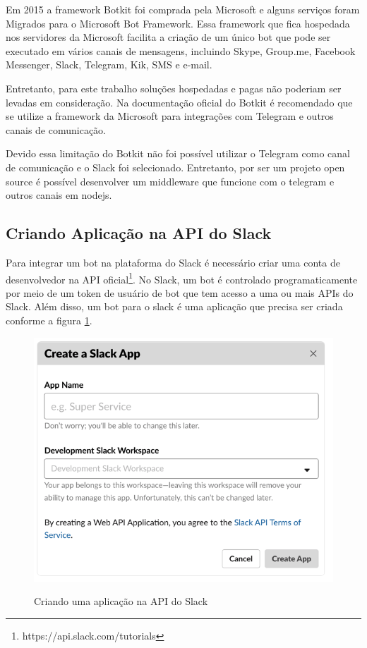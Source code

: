 Em 2015 a framework Botkit foi comprada pela Microsoft e alguns serviços foram Migrados para o Microsoft Bot Framework. Essa framework que fica hospedada nos servidores da Microsoft facilita a criação de um único bot que pode ser executado em vários canais de mensagens, incluindo Skype, Group.me, Facebook Messenger, Slack, Telegram, Kik, SMS e e-mail.

Entretanto, para este trabalho soluções hospedadas e pagas não poderiam ser levadas em consideração. Na documentação oficial do Botkit é recomendado que se utilize a framework da Microsoft para integrações com Telegram e outros canais de comunicação.

Devido essa limitação do Botkit não foi possível utilizar o Telegram como canal de comunicação e o Slack foi selecionado. Entretanto, por ser um projeto open source é possível desenvolver um middleware que funcione com o telegram e outros canais em nodejs. 

\subsection{Criando Aplicação na API do Slack}

Para integrar um bot na plataforma do Slack é necessário criar uma conta de desenvolvedor na API oficial\footnote{https://api.slack.com/tutorials}. No Slack, um bot é controlado programaticamente por meio de um token de usuário de bot que tem acesso a uma ou mais APIs do Slack. Além disso, um bot para o slack é uma aplicação que precisa ser criada conforme a figura \ref{cadastro_slack}.

\begin{figure}[H]
  \centering
   \caption{Criando uma aplicação na API do Slack}
  \includegraphics[scale=0.5]{Imagens/slack_cadastro.png} 
  \label{cadastro_slack}
\end{figure}

